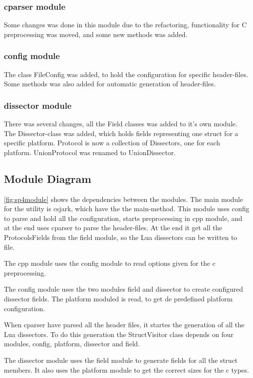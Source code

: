 \subsubsection{cparser module}
Some changes was done in this module due to the refactoring, functionality for C preprocessing was moved, and some new methods was added. 

\subsubsection{config module}
The class FileConfig was added, to hold the configuration for specific header-files. Some methods was also added for automatic generation of header-files.

\subsubsection{dissector module}
There was several changes, all the Field classes was added to it's own module.
The Dissector-class was added, which holds fields representing one struct for
a specific platform. Protocol is now a collection of Dissectors, one for each
platform. UnionProtocol was renamed to UnionDissector.

\subsection{Module Diagram}
\label{sec:sp4:design:md}
\autoref{fig:sp4module} shows the dependencies between the modules. The main 
module for the utility is csjark, which have the the main-method. This module 
uses config to parse and hold all the configuration, starts preprocessing in 
cpp module, and at the end uses cparser to parse the header-files. At the end 
it get all the ProtocolsFields from the field module, so the Lua dissectors 
can be written to file.

The cpp module uses the config module to read options given for the c 
preprocessing.

The config module uses the two modules field and dissector to create 
configured dissector fields. The platform moduled is read, to get de 
predefined platform configuration.

When cparser have parsed all the header files, it startes the generation of 
all the Lua dissectors. To do this generation the StructVisitor class depends 
on four modules, config, platform, dissector and field.

The dissector module uses the field module to generate fields for all the 
struct members. It also uses the platform module to get the correct sizes for 
the c types.

